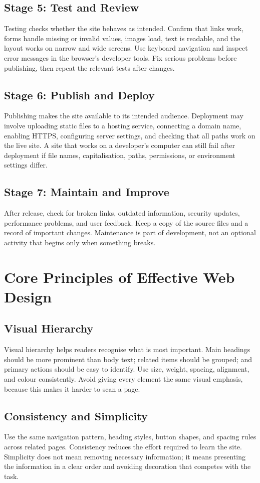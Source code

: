 \documentclass[11pt,openany,oneside]{book}
\begin{document}
\subsection{Stage 5: Test and Review}
Testing checks whether the site behaves as intended. Confirm that links work, forms handle missing or invalid values, images load, text is readable, and the layout works on narrow and wide screens. Use keyboard navigation and inspect error messages in the browser's developer tools. Fix serious problems before publishing, then repeat the relevant tests after changes.

\subsection{Stage 6: Publish and Deploy}
Publishing makes the site available to its intended audience. Deployment may involve uploading static files to a hosting service, connecting a domain name, enabling HTTPS, configuring server settings, and checking that all paths work on the live site. A site that works on a developer's computer can still fail after deployment if file names, capitalisation, paths, permissions, or environment settings differ.

\subsection{Stage 7: Maintain and Improve}
After release, check for broken links, outdated information, security updates, performance problems, and user feedback. Keep a copy of the source files and a record of important changes. Maintenance is part of development, not an optional activity that begins only when something breaks.

\section{Core Principles of Effective Web Design}
\subsection{Visual Hierarchy}
Visual hierarchy helps readers recognise what is most important. Main headings should be more prominent than body text; related items should be grouped; and primary actions should be easy to identify. Use size, weight, spacing, alignment, and colour consistently. Avoid giving every element the same visual emphasis, because this makes it harder to scan a page.

\subsection{Consistency and Simplicity}
Use the same navigation pattern, heading styles, button shapes, and spacing rules across related pages. Consistency reduces the effort required to learn the site. Simplicity does not mean removing necessary information; it means presenting the information in a clear order and avoiding decoration that competes with the task.
\end{document}
